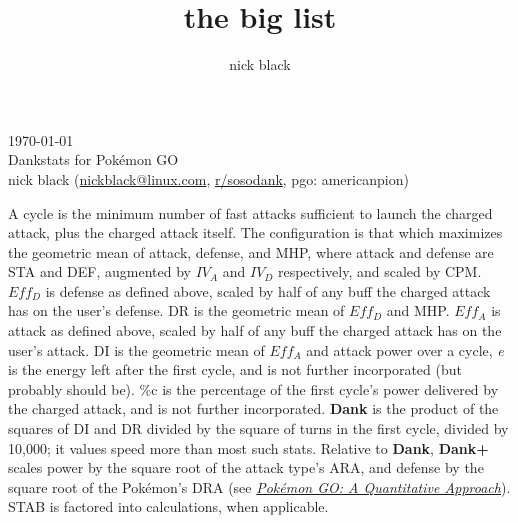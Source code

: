 \documentclass[ebook,10pt,openany,oneside]{memoir}
\title{the big list}
\author{nick black}
\begin{document}
\noindent{}\today\\
Dankstats for Pokémon GO\\
nick black (\href{mailto:nickblack@linux.com}{nickblack@linux.com}, \href{https://www.reddit.com/user/sosodank/}{r/sosodank}, pgo: americanpion)\\
\bigskip

A cycle is the minimum number of fast attacks sufficient to launch the charged attack, plus the charged attack itself.
The configuration is that which maximizes the geometric mean of attack, defense, and MHP, where attack and defense are STA and DEF, augmented by $IV_A$ and $IV_D$ respectively, and scaled by CPM.
$Eff_D$ is defense as defined above, scaled by half of any buff the charged attack has on the user's defense.
DR is the geometric mean of $Eff_D$ and MHP.
$Eff_A$ is attack as defined above, scaled by half of any buff the charged attack has on the user's attack.
DI is the geometric mean of $Eff_A$ and attack power over a cycle,
\textit{e} is the energy left after the first cycle, and is not further incorporated (but probably should be).
\%c is the percentage of the first cycle's power delivered by the charged attack, and is not further incorporated.
\textbf{Dank} is the product of the squares of DI and DR divided by the square of turns in the first cycle, divided by 10,000; it values speed more than most such stats.
Relative to \textbf{Dank}, \textbf{Dank+} scales power by the square root of the attack type's ARA, and defense by the square root of the Pokémon's DRA (see \textit{\href{https://nick-black.com/pgo-quantitative.pdf}{Pokémon GO: A Quantitative Approach}}).
STAB is factored into calculations, when applicable.
\bigskip

\footnotesize
\setlength{\tabcolsep}{2pt}



\end{document}
